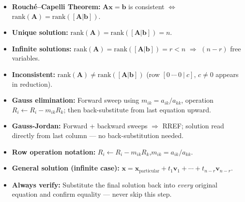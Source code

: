 \documentclass[12pt,a4paper]{article}
\begin{document}
\begin{learnbox}
\begin{itemize}[leftmargin=1.5em]
  \item \textbf{Rouch\'{e}--Capelli Theorem:} $\mathbf{A}\mathbf{x} = \mathbf{b}$ is consistent
        $\Leftrightarrow$ $\text{rank}(\mathbf{A}) = \text{rank}([\mathbf{A}|\mathbf{b}])$.
  \item \textbf{Unique solution:} $\text{rank}(\mathbf{A}) = \text{rank}([\mathbf{A}|\mathbf{b}]) = n$.
  \item \textbf{Infinite solutions:} $\text{rank}(\mathbf{A}) = \text{rank}([\mathbf{A}|\mathbf{b}]) = r < n$
        $\Rightarrow$ $(n-r)$ free variables.
  \item \textbf{Inconsistent:} $\text{rank}(\mathbf{A}) \neq \text{rank}([\mathbf{A}|\mathbf{b}])$
        (row $[0\ \cdots\ 0\ |\ c]$, $c \neq 0$ appears in reduction).
  \item \textbf{Gauss elimination:} Forward sweep using $m_{ik} = a_{ik}/a_{kk}$,
        operation $R_i \leftarrow R_i - m_{ik}R_k$; then back-substitute from last equation upward.
  \item \textbf{Gauss-Jordan:} Forward + backward sweeps $\Rightarrow$ RREF; solution read directly
        from last column --- no back-substitution needed.
  \item \textbf{Row operation notation:} $R_i \leftarrow R_i - m_{ik}R_k$,\quad $m_{ik} = a_{ik}/a_{kk}$.
  \item \textbf{General solution (infinite case):}
        $\mathbf{x} = \mathbf{x}_{\text{particular}} + t_1\mathbf{v}_1 + \cdots + t_{n-r}\mathbf{v}_{n-r}$.
  \item \textbf{Always verify:} Substitute the final solution back into \textit{every} original equation
        and confirm equality --- never skip this step.
\end{itemize}
\end{learnbox}
\end{document}
